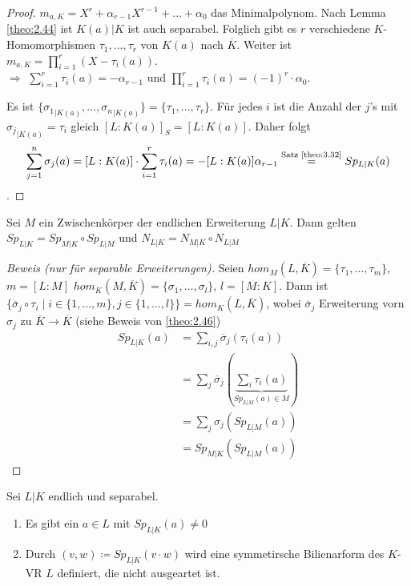 \documentclass[../main.tex]{subfiles}
\begin{document}
\begin{proof}
    $m_{a,K} = X^r+\alpha_{r-1}X^{r-1}+\dots + \alpha_0$
    das Minimalpolynom.
    Nach Lemma \ref{theo:2.44} ist $K(a)|K$ ist auch separabel.
    Folglich gibt es $r$ verschiedene $K$-Homomorphismen $\tau_1,\dots,\tau_r$ von $K(a)$ nach $\overline{K}$.
    Weiter ist $m_{a,K} = \prod_{i=1}^r (X-\tau_i(a))$.\\
    $\Longrightarrow$ $\sum_{i=1}^r\tau_i(a) = -\alpha_{r-1}$ und $\prod_{i=1}^r \tau_i(a) = (-1)^r \cdot \alpha_0$.

    Es ist $\{{\sigma_1}_{|K(a)}, \dots, {\sigma_n}_{|K(a)}\} = \{\tau_1,\dots,\tau_r\}$.
    Für jedes $i$ ist die Anzahl der $j$'s mit ${\sigma_j}_{|K(a)} = \tau_i$ gleich $[L:K(a)]_S = [L:K(a)]$.
    Daher folgt $$\sum_{j=1}^n\sigma_j(a) = [L:K(a)]\cdot \sum_{i=1}^r \tau_i(a) = -[L:K(a)]\alpha_{r-1} \overset{\text{Satz \ref{theo:3.32}}}{ =} Sp_{L|K}(a)$$.
\end{proof}
\begin{theorem}
    Sei $M$ ein Zwischenkörper der endlichen Erweiterung $L|K$.
    Dann gelten $Sp_{L|K} = Sp_{M|K}\circ Sp_{L|M}$ und
    $N_{L|K} = N_{M|K}\circ N_{L|M}$
\end{theorem}
\begin{proof}[Beweis (nur für separable Erweiterungen)]
    Seien $hom_M(L,\overline{K}) = \{\tau_1,\dots,\tau_m\}$, $m=[L:M]$
    $hom_K(M,\overline{K}) = \{\sigma_1,\dots,\sigma_l\}$, $l = [M:K]$.
    Dann ist $\{\overline{\sigma}_j\circ\tau_i\mid i \in \{1,\dots,m\}, j\in \{1,\dots,l\}\} = hom_K(L,\overline{K})$, wobei $\overline{\sigma}_j$ Erweiterung vorn $\sigma_j$ zu $\overline{K}\rightarrow \overline{K}$ (siehe Beweis von \ref{theo:2.46})
    \begin{align*}
        Sp_{L|K}(a) &= \sum_{i,j} \overline{\sigma}_j(\tau_i(a))\\
        &=\sum_j\overline{\sigma}_j(\underbrace{\sum_i \tau_i (a)}_{Sp_{L|M}(a)\in M})\\
        &= \sum_j \sigma_j (Sp_{L|M} (a))\\
        &= Sp_{M|K}(Sp_{L|M}(a))
    \end{align*}
\end{proof}
\begin{theorem}
    Sei $L|K$ endlich und separabel.
    \begin{enumerate}[label=\alph*)]
        \item Es gibt ein $a\in L$ mit $Sp_{L|K}(a)\neq 0$
        \item Durch $(v,w)\coloneqq Sp_{L|K}(v\cdot w)$ wird eine symmetirsche Bilienarform des $K$-VR $L$ definiert, die nicht ausgeartet ist.
    \end{enumerate}
\end{theorem}
\end{document}
